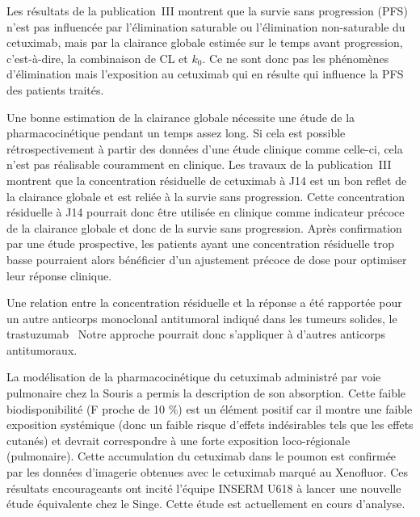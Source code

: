 Les résultats de la publication~III montrent que la survie sans progression (PFS) n'est pas influencée par l'élimination saturable ou l'élimination non-saturable du cetuximab, mais par la clairance globale estimée sur le temps avant progression, c'est-à-dire, la combinaison de \gls{CL} et $k_0$. Ce ne sont donc pas les phénomènes d'élimination mais l'exposition au cetuximab qui en résulte qui influence la PFS des patients traités.

Une bonne estimation de la clairance globale nécessite une étude de la pharmacocinétique pendant un temps assez long. Si cela est possible rétrospectivement à partir des données d'une étude clinique comme celle-ci, cela n'est pas réalisable couramment en clinique. Les travaux de la publication~III montrent que la concentration résiduelle de cetuximab à J14 est un bon reflet de la clairance globale et est reliée à la survie sans progression. Cette concentration résiduelle à J14 pourrait donc être utilisée en clinique comme indicateur précoce de la clairance globale et donc de la survie sans progression. Après confirmation par une étude prospective, les patients ayant une concentration résiduelle trop basse pourraient alors bénéficier d'un ajustement précoce de dose pour optimiser leur réponse clinique.

Une relation entre la concentration résiduelle et la réponse a été rapportée pour un autre anticorps monoclonal antitumoral indiqué dans les tumeurs solides, le trastuzumab~\citep{REF145} Notre approche pourrait donc s'appliquer à d'autres anticorps antitumoraux.

La modélisation de la pharmacocinétique du cetuximab administré par voie pulmonaire chez la Souris a permis la description de son absorption. Cette faible biodisponibilité (F proche de 10 $\%$) est un élément positif car il montre une faible exposition systémique (donc un faible risque d'effets indésirables tels que les effets cutanés) et devrait correspondre à une forte exposition loco-régionale (pulmonaire). Cette accumulation du cetuximab dans le poumon est confirmée par les données d'imagerie obtenues avec le cetuximab marqué au Xenofluor. Ces résultats encourageants ont incité l'équipe INSERM U618 à lancer une nouvelle étude équivalente chez le Singe. Cette étude est actuellement en cours d'analyse.

